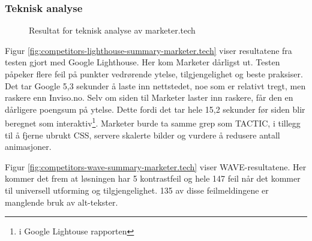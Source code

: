 \subsubsection{Teknisk analyse}
\begin{figure}[H]
    \begin{center}
        
        \label{fig:competitors-tech_analysis-marketer.tech}
        \caption{Resultat for teknisk analyse av marketer.tech}
    \end{center}
\end{figure}

Figur \ref{fig:competitors-lighthouse-summary-marketer.tech} viser resultatene fra testen gjort med Google Lighthouse. Her kom Marketer dårligst ut. Testen påpeker flere feil på punkter vedrørende ytelse, tilgjengelighet og beste praksiser. Det tar Google 5,3 sekunder å laste inn nettstedet, noe som er relativt tregt, men raskere enn Inviso.no. Selv om siden til Marketer laster inn raskere, får den en dårligere poengsum på ytelse. Dette fordi det tar hele 15,2 sekunder før siden blir beregnet som interaktiv\footnote{ i Google Lightouse rapporten}. Marketer burde ta samme grep som TACTIC, i tillegg til å fjerne ubrukt CSS, servere skalerte bilder og vurdere å redusere antall animasjoner.

Figur \ref{fig:competitors-wave-summary-marketer.tech} viser WAVE-resultatene. Her kommer det frem at løsningen har 5 kontrastfeil og hele 147 feil når det kommer til universell utforming og tilgjengelighet. 135 av disse feilmeldingene er manglende bruk av alt-tekster.

